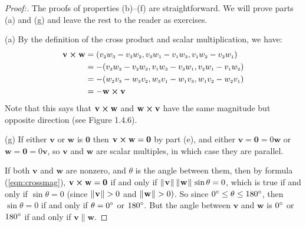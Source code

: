 \begin{proofbar}\begin{proof}[Proof:]
 The proofs of properties (b)--(f) are straightforward. We will prove parts (a) and (g) and leave the rest to the
 reader as exercises.
 \piccaption[]{}
 \par\noindent(a)
 By the definition of the cross product and scalar multiplication, we have:
 \begin{align*}
  \mathbf{v} \bm{\times} \mathbf{w} &= (v_{\scriptscriptstyle 2}w_{\scriptscriptstyle 3} - v_{\scriptscriptstyle 3}w_{\scriptscriptstyle 2},
   v_{\scriptscriptstyle 3}w_{\scriptscriptstyle 1} - v_{\scriptscriptstyle 1}w_{\scriptscriptstyle 3}, v_{\scriptscriptstyle 1}w_{\scriptscriptstyle 2} - v_{\scriptscriptstyle 2}w_{\scriptscriptstyle 1})\\
  &= -(v_{\scriptscriptstyle 3}w_{\scriptscriptstyle 2} - v_{\scriptscriptstyle 2}w_{\scriptscriptstyle 3},
   v_{\scriptscriptstyle 1}w_{\scriptscriptstyle 3} - v_{\scriptscriptstyle 3}w_{\scriptscriptstyle 1}, v_{\scriptscriptstyle 2}w_{\scriptscriptstyle 1} - v_{\scriptscriptstyle 1}w_{\scriptscriptstyle 2})\\
  &= -(w_{\scriptscriptstyle 2}v_{\scriptscriptstyle 3} - w_{\scriptscriptstyle 3}v_{\scriptscriptstyle 2},
   w_{\scriptscriptstyle 3}v_{\scriptscriptstyle 1} - w_{\scriptscriptstyle 1}v_{\scriptscriptstyle 3}, w_{\scriptscriptstyle 1}v_{\scriptscriptstyle 2} - w_{\scriptscriptstyle 2}v_{\scriptscriptstyle 1})\\
  &= -\mathbf{w} \bm{\times} \mathbf{v}
 \end{align*}
 Note that this says that $\mathbf{v} \bm{\times} \mathbf{w}$ and $\mathbf{w} \bm{\times} \mathbf{v}$ have the same
 magnitude but opposite direction (see Figure 1.4.6).
 \par\noindent(g)
 If either $\mathbf{v}$ or $\mathbf{w}$ is $\mathbf{0}$ then $\mathbf{v} \bm{\times} \mathbf{w} = \mathbf{0}$ by part (e),
 and either $\mathbf{v} = \mathbf{0} = 0\mathbf{w}$ or $\mathbf{w} = \mathbf{0} = 0\mathbf{v}$, so $\mathbf{v}$ and
$\mathbf{w}$ are scalar multiples, 
in which case they are parallel.
 
 If both $\mathbf{v}$ and $\mathbf{w}$ are nonzero, and $\theta$ is the angle between them, then by formula
 (\ref{eqn:crossmag}), $\mathbf{v} \bm{\times} \mathbf{w} = \mathbf{0}$ if and only if
 $\lVert\mspace{1mu}\mathbf{v}\mspace{1mu}\rVert\,\lVert\mspace{1mu}\mathbf{w}\mspace{1mu}\rVert\,\sin \theta = 0$, which is true if and only if $\sin \theta = 0$ (since
 $\lVert\mspace{1mu}\mathbf{v}\mspace{1mu}\rVert > 0$ and $\lVert\mspace{1mu}\mathbf{w}\mspace{1mu}\rVert > 0)$. So since $0^\circ \le \theta \le 180^\circ$, then
 $\sin \theta = 0$ if and only if $\theta = 0^\circ$ or $180^\circ$. 
 But the angle between $\mathbf{v}$ and $\mathbf{w}$
 is $0^\circ$ or $180^\circ$ if and only if $\mathbf{v} \parallel \mathbf{w}$.
\end{proof}\end{proofbar}

